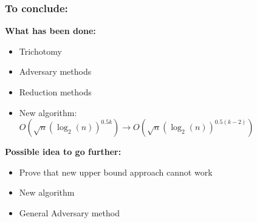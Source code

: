 \documentclass[9pt, notheorems]{beamer}
\theoremstyle{definition}
\theoremstyle{plain}
\theoremstyle{definition}
\begin{document}
\begin{frame}
    \frametitle{To conclude:}
    \textbf{What has been done:}
    \begin{itemize}
        \item Trichotomy
        \item Adversary methods
        \item Reduction methods
        \item New algorithm: $O\left(\sqrt{n}(\log_2(n))^{0.5k}\right) \rightarrow O\left(\sqrt{n}(\log_2(n))^{0.5(k-2)} \right)$
    \end{itemize}
    \pause
    \textbf{Possible idea to go further:}
    \begin{itemize}
        \item Prove that new upper bound approach cannot work
        \item New algorithm
        \item General Adversary method
    \end{itemize}

\end{frame}


\begin{frame}
    
    

\end{frame}
\end{document}
